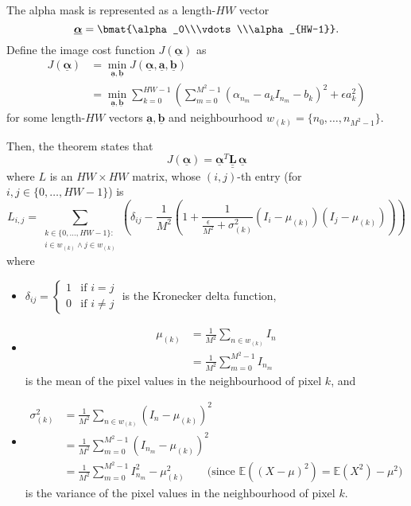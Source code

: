 \documentclass{article}
\def\vt#1{\underline{\mathbf{#1}}}
\def\vts#1{\underline{\boldsymbol{#1}}}
\def\mt#1{\underline{\underline{\mathbf{#1}}}}
\begin{document}
The alpha mask is represented as a length-$HW$ vector
$$\vts\alpha = \bmat{\alpha_0\\\vdots\\\alpha_{HW-1}}.$$
Define the image cost function $J(\vts\alpha)$ as
\begin{align*}
    J(\vts\alpha) &= \min_{\vt a,\vt b} J(\vts\alpha, \vt a, \vt b)\\
    &= \min_{\vt a,\vt b} \sum_{k=0}^{HW-1} \left(\sum_{m=0}^{M^2-1} \left(\alpha_{n_m} - a_kI_{n_m} - b_k\right)^2 + \epsilon a_k^2 \right)%
\end{align*}
for some length-$HW$ vectors $\vt a, \vt b$ and neighbourhood $w_{(k)}=\{n_0,\dots,n_{M^2-1}\}$.

Then, the theorem states that
$$J(\vts \alpha) = \vts \alpha^T \mt L\, \vts \alpha$$
where $L$ is an $HW\times HW$ matrix, whose $(i,j)$-th entry (for $i,j\in\{0,\dots,HW-1\}$) is
$$L_{i,j} = \sum_{\substack{k\in\{0,\dots,HW-1\}:\\i\in w_{(k)}\wedge j\in w_{(k)}}} \left( \delta_{ij} - \frac1{M^2}\left(1 + \frac1{\frac\epsilon{M^2} + \sigma_{(k)}^2} \left({I}_i - \mu_{(k)}\right) \left({I}_j - \mu_{(k)}\right) \right) \right)$$
where
\begin{itemize}
    \item $\delta_{ij} = \begin{cases}
        1&\text{if $i=j$}\\
        0&\text{if $i\neq j$}
    \end{cases}$ is the Kronecker delta function,
    \item \begin{align*}
        \mu_{(k)} &= \frac1{M^2} \sum_{n\in w_{(k)}} I_{n} \\&= \frac1{M^2} \sum_{m=0}^{M^2-1} I_{n_m}
    \end{align*} is the mean of the pixel values in the neighbourhood of pixel $k$, and
    \item \begin{align*}
        \sigma^2_{(k)} &= \frac1{M^2} \sum_{n\in w_{(k)}} \left(I_n- \mu_{(k)}\right)^2 \\
        &=  \frac1{M^2} \sum_{m=0}^{M^2-1} \left(I_{n_m}- \mu_{(k)}\right)^2 \\
        &=  \frac1{M^2} \sum_{m=0}^{M^2-1} I_{n_m}^2 - \mu_{(k)}^2 \qquad \text{(since $\mathbb{E}\left((X-\mu)^2\right) = \mathbb{E}\left(X^2\right) - \mu^2$)}
    \end{align*} is the variance of the pixel values in the neighbourhood of pixel $k$.
\end{itemize}
\end{document}
